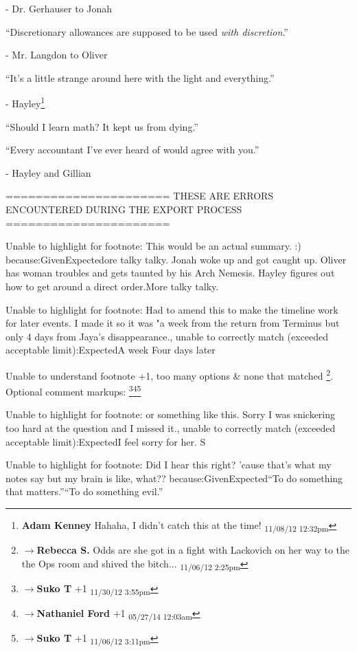 - Dr. Gerhauser to Jonah



``Discretionary allowances are supposed to be used \textit{with discretion}.''

- Mr. Langdon to Oliver



``It's a little strange around here with the light and everything.''

- Hayley\footnote{\textbf{Adam Kenney }Hahaha, I didn't catch this at the time! \textsubscript{11/08/12 12:32pm}}



``Should I learn math?  It kept us from dying.''

``Every accountant I've ever heard of would agree with you.''

                - Hayley and Gillian


\iffalse

======================
THESE ARE ERRORS ENCOUNTERED DURING THE EXPORT PROCESS
======================

	Unable to highlight for footnote: This would be an actual summary. :) because:GivenExpectedore talky talky. Jonah woke up and got caught up. Oliver has woman troubles and gets taunted by his Arch Nemesis.  Hayley figures out how to get around a direct order.More talky talky.

	Unable to highlight for footnote: Had to amend this to make the timeline work for later events.  I made it so it was "a week from the return from Terminus but only 4 days from Jaya's disappearance., unable to correctly match (exceeded acceptable limit):ExpectedA week Four days later

	Unable to understand footnote +1, too many options & none that matched \footnote{$\rightarrow$\textbf{Rebecca S. }Odds are she got in a fight with Lackovich on her way to the the Ops room and shived the bitch... \textsubscript{11/06/12 2:25pm}}. Optional comment markups: \footnote{$\rightarrow$\textbf{Suko T }+1 \textsubscript{11/30/12 3:55pm}}\footnote{$\rightarrow$\textbf{Nathaniel Ford }+1 \textsubscript{05/27/14 12:03am}}\footnote{$\rightarrow$\textbf{Suko T }+1 \textsubscript{11/06/12 3:11pm}} 

	Unable to highlight for footnote: or something like this.  Sorry I was snickering too hard at the question and I missed it., unable to correctly match (exceeded acceptable limit):ExpectedI feel sorry for her.  S

	Unable to highlight for footnote: Did I hear this right?  'cause that's what my notes say but my brain is like, what?? because:GivenExpected“To do something that matters.”“To do something evil.”

